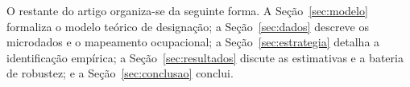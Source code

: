 O restante do artigo organiza-se da seguinte forma. A Seção~\ref{sec:modelo} formaliza o modelo teórico de designação; a Seção~\ref{sec:dados} descreve os microdados e o mapeamento ocupacional; a Seção~\ref{sec:estrategia} detalha a identificação empírica; a Seção~\ref{sec:resultados} discute as estimativas e a bateria de robustez; e a Seção~\ref{sec:conclusao} conclui.

